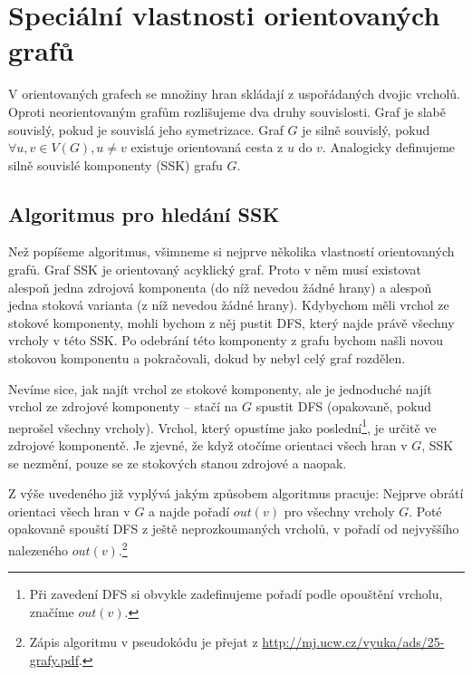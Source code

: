 \section{Speciální vlastnosti orientovaných grafů}

V orientovaných grafech se množiny hran skládají z uspořádaných dvojic vrcholů.
Oproti neorientovaným grafům rozlišujeme dva druhy souvislosti. Graf je slabě
souvislý, pokud je souvislá jeho symetrizace. Graf $G$ je silně souvislý, pokud
$\forall u,v \in V(G), u\neq v$ existuje orientovaná cesta z $u$ do $v$.
Analogicky definujeme silně souvislé komponenty (SSK) grafu $G$.

\subsection{Algoritmus pro hledání SSK}

Než popíšeme algoritmus, všimneme si nejprve několika vlastností orientovaných grafů. Graf SSK je orientovaný acyklický graf. Proto v něm musí existovat alespoň jedna zdrojová komponenta (do níž nevedou žádné hrany) a alespoň jedna stoková varianta (z níž nevedou žádné hrany). Kdybychom měli vrchol ze stokové komponenty, mohli bychom z něj pustit DFS, který najde právě všechny vrcholy v této SSK. Po odebrání této komponenty z grafu bychom našli novou stokovou komponentu a pokračovali, dokud by nebyl celý graf rozdělen.

Nevíme sice, jak najít vrchol ze stokové komponenty, ale je jednoduché najít vrchol ze zdrojové komponenty -- stačí na $G$ spustit DFS (opakovaně, pokud neprošel všechny vrcholy). Vrchol, který opustíme jako poslední\footnote{Při zavedení DFS si obvykle zadefinujeme pořadí podle opouštění vrcholu, značíme $out(v)$.}, je určitě ve zdrojové komponentě. Je zjevné, že když otočíme orientaci všech hran v $G$, SSK se nezmění, pouze se ze stokových stanou zdrojové a naopak.


Z výše uvedeného již vyplývá jakým způsobem algoritmus pracuje: Nejprve obrátí orientaci všech hran v $G$ a najde pořadí $out(v)$ pro všechny vrcholy $G$. Poté opakovaně spouští DFS z ještě neprozkoumaných vrcholů, v pořadí od nejvyššího nalezeného $out(v)$.\footnote{Zápis algoritmu v pseudokódu je přejat z \url{http://mj.ucw.cz/vyuka/ads/25-grafy.pdf}.}

